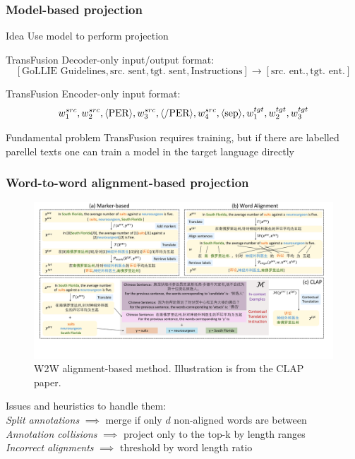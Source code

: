 \documentclass{beamer}
\newcommand{\src}[1]{#1^{src}}
\newcommand{\tgt}[1]{#1^{tgt}}
\begin{document}
\begin{frame}
  \frametitle{Model-based projection}

  \begin{block}{Idea}
    Use model to perform projection
  \end{block}

  TransFusion Decoder-only input/output format:
  \[
    [\text{GoLLIE Guidelines}, \text{src. sent}, \text{tgt. sent}, \text{Instructions}]
    \stackrel{}{\rightarrow}
    [\text{src. ent.}, \text{tgt. ent.}]
  \]

  TransFusion Encoder-only input format:\\
  \[
    \src{w_1},
    \src{w_2},
    \text{\textlangle PER\textrangle},
    \src{w_3},
    \text{\textlangle/PER\textrangle},
    \src{w_4},
    \text{\textlangle sep\textrangle},
    \tgt{w_1},
    \tgt{w_2},
    \tgt{w_3}
  \]

  \begin{alertblock}{Fundamental problem}
    TransFusion requires training, but if there are labelled parellel texts one can train a model in
    the target language directly
  \end{alertblock}
\end{frame}

\begin{frame}
  \frametitle{Word-to-word alignment-based projection}
  \begin{figure}
    \includegraphics[height=0.4\textheight, clip, trim=24.5cm 10.7cm 0cm 1cm]{ClAP_marker_align.pdf}
    \caption{W2W alignment-based method. Illustration is from the CLAP paper.}
  \end{figure}

  \begin{flushleft}
    Issues and heuristics to handle them: \\
    \textit{Split annotations} \( \implies \) merge if only \( d \) non-aligned words are between \\
    \textit{Annotation collisions} \( \implies \) project only to the top-k by length ranges \\
    \textit{Incorrect alignments} \( \implies \) threshold by word length ratio
  \end{flushleft}
\end{frame}
\end{document}
